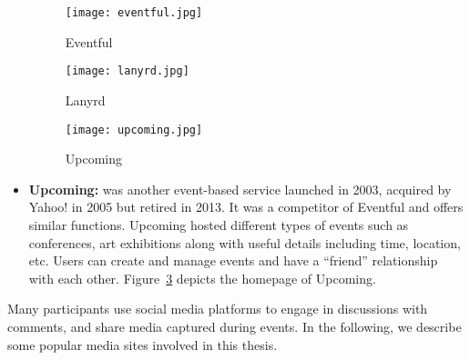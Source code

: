 \begin{itemize}
 \begin{figure}[H]
   \centering
  \texttt{[image: eventful.jpg]}
  \caption{Eventful}
  \label{fig:eventful}
 \end{figure} 
 
  \begin{figure}[H]
   \centering
  \texttt{[image: lanyrd.jpg]}
  \caption{Lanyrd}
  \label{fig:lanyrd}
  \end{figure} 
  
 \begin{figure}[H]
   \centering
  \texttt{[image: upcoming.jpg]}
  \caption{Upcoming}
  \label{fig:upcoming}
  \end{figure}   
 
   \item \textbf{Upcoming:} was another event-based service launched in 2003, acquired
by Yahoo! in 2005 but retired in 2013. It was a competitor of Eventful and offers similar functions. Upcoming hosted different types of events such as conferences, art exhibitions along with useful details including time, location, etc. Users can create and manage events and have a ``friend'' relationship with each other. Figure~\ref{fig:upcoming} depicts the homepage of Upcoming.

\end{itemize}

 Many participants use social media platforms to engage in discussions with comments, and share media captured during events. In the following, we describe some popular media sites involved in this thesis.  


